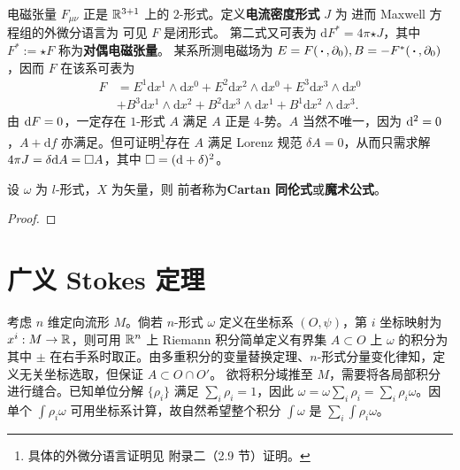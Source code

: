 \begin{eg}
    电磁张量 $F_{\mu\nu}$ 正是 $\mathbb{R}^{3+1}$ 上的 $2$-形式。定义\textbf{电流密度形式} $J$ 为
进而 Maxwell 方程组的外微分语言为
可见 $F$ 是闭形式。
第二式又可表为 $\mathrm{d}F^*=4\pi{\star J}$，其中 $F^*:={\star}F$ 称为\textbf{对偶电磁张量}。
某系所测电磁场为 $E=F(\oo,\del_0),B=-F^*(\oo,\del_0)$，因而 $F$ 在该系可表为
\begin{align*}F&= E^{1} \mathrm{d} x^{1} \wedge \mathrm{d} x^{0}+E^{2} \mathrm{d} x^{2} \wedge \mathrm{d} x^{0}+E^{3} \mathrm{d} x^{3} \wedge \mathrm{d} x^{0} \\&+ B^{3} \mathrm{d} x^{1} \wedge \mathrm{d} x^{2}+B^{2} \mathrm{d} x^{3} \wedge \mathrm{d} x^{1}+B^{1} \mathrm{d} x^{2} \wedge \mathrm{d} x^{3}.\end{align*}
由 $\dd F=0$，一定存在 $1$-形式 $A$ 满足
$A$ 正是 $4$-势。$A$ 当然不唯一，因为 $\dd^{2}=0$，$A+\mathrm{d} f$ 亦满足。但可证明\footnote{具体的外微分语言证明见 \cite{Parrott} 附录二（2.9 节）证明。}存在 $A$ 满足 Lorenz 规范 $\delta A=0$，从而只需求解 $4\pi J=\delta\dd A=\square A$，其中 $\square=(\dd+\delta)^2$。
\end{eg}

\begin{theorem}[Cartan]
    设 $\omega$ 为 $l$-形式，$X$ 为矢量，则
    前者称为\textbf{Cartan 同伦式}或\textbf{魔术公式}。
\end{theorem}
\begin{proof}
    
\end{proof}


\section{广义 Stokes 定理}

考虑 $n$ 维定向流形 $M$。倘若 $n$-形式 $\omega$ 定义在坐标系 $(O,\psi)$，第 $i$ 坐标映射为 $x^i:M\to\mathbb{R}$，则可用 $\mathbb{R}^n$ 上 Riemann 积分简单定义有界集 $A\subset O$ 上 $\omega$ 的积分为 
其中 $\pm$ 在右手系时取正。由多重积分的变量替换定理、$n$-形式分量变化律知，定义无关坐标选取，但保证 $A\subset O\cap O'$。
欲将积分域推至 $M$，需要将各局部积分进行缝合。已知单位分解 $\{\rho_i\}$ 满足 $\sum_i\rho_i=1$，因此 $\omega=\omega\sum_i\rho_i=\sum_i\rho_i\omega$。因单个 $\int\rho_i\omega$ 可用坐标系计算，故自然希望整个积分 $\int\omega$ 是 $\sum_i\int\rho_i\omega$。

